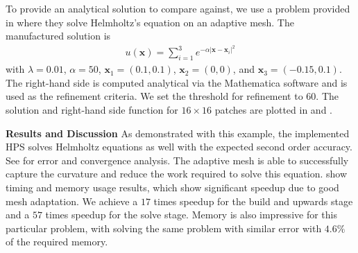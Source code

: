 To provide an analytical solution to compare against, we use a problem provided in \cite{cheng2006adaptive} where they solve Helmholtz's equation on an adaptive mesh. The manufactured solution is
\begin{align}
    u(\textbf{x}) = \sum_{i=1}^{3} e^{-\alpha |\textbf{x} - \textbf{x}_i|^2}
\end{align}
with $\lambda=0.01$, $\alpha=50$, $\textbf{x}_1 = (0.1, 0.1)$, $\textbf{x}_2 = (0, 0)$, and $\textbf{x}_3 = (-0.15, 0.1)$. The right-hand side is computed analytical via the Mathematica software \cite{Mathematica} and is used as the refinement criteria. We set the threshold for refinement to $60$. The solution and right-hand side function for $16 \times 16$ patches are plotted in  and .

{\bf Results and Discussion}
As demonstrated with this example, the implemented HPS solves Helmholtz equations as well with the expected second order accuracy. See  for error and convergence analysis. The adaptive mesh is able to successfully capture the curvature and reduce the work required to solve this equation.  show timing and memory usage results, which show significant speedup due to good mesh adaptation. We achieve a $17$ times speedup for the build and upwards stage and a $57$ times speedup for the solve stage. Memory is also impressive for this particular problem, with solving the same problem with similar error with $4.6\%$ of the required memory.


